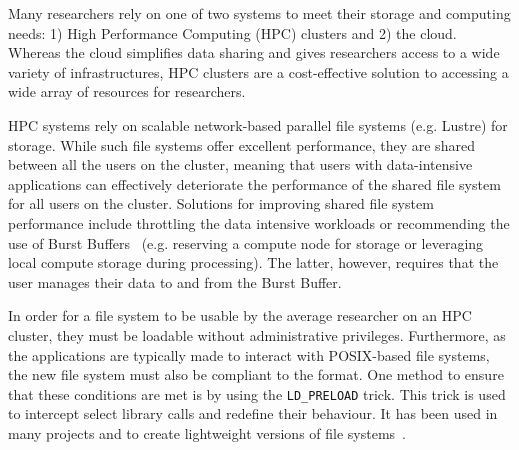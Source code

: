     
    
    
    Many researchers rely on one of two systems to meet their storage and
    computing needs: 1) High Performance Computing (HPC) clusters and 2) the
    cloud. Whereas the cloud simplifies data sharing and gives researchers
    access to a wide variety of infrastructures, HPC clusters are a
    cost-effective solution to accessing a wide array of resources for
    researchers. %
    
    HPC systems rely on scalable network-based parallel file systems (e.g.
    Lustre) for storage. While such file systems offer excellent performance,
    they are shared between all the users on the cluster, meaning that users
    with data-intensive applications can effectively deteriorate the performance
    of the shared file system for all users on the cluster. Solutions for
    improving shared file system performance include throttling the data
    intensive workloads or recommending the use of Burst Buffers~\cite{bb} (e.g.
    reserving a compute node for storage or leveraging local compute storage
    during processing). The latter, however, requires that the user manages
    their data to and from the Burst Buffer.
    
    In order for a file system to be usable by the average researcher on an HPC
    cluster, they must be loadable without administrative privileges.
    Furthermore, as the applications are typically made to interact with
    POSIX-based file systems, the new file system must also be compliant to the
    format. One method to ensure that these conditions are met is by using the
    \texttt{LD\_PRELOAD} trick. This trick is used to intercept select library
    calls and redefine their behaviour. It has been used in many projects and to
    create lightweight versions of file systems~\cite{xtreemfs}. 
    
